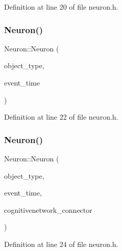 Definition at line 20 of file neuron.\+h.

\mbox{\label{class_neuron_a4611499895417d44250c452d0fc719a6}} 
\subsubsection{\texorpdfstring{Neuron()}{Neuron()}\hspace{0.1cm}{\footnotesize\ttfamily [3/4]}}
{\footnotesize\ttfamily Neuron\+::\+Neuron (\begin{DoxyParamCaption}\item[{unsigned int}]{object\+\_\+type,  }\item[{std\+::chrono\+::time\+\_\+point$<$ \hyperlink{universe_8h_a0ef8d951d1ca5ab3cfaf7ab4c7a6fd80}{Clock} $>$}]{event\+\_\+time }\end{DoxyParamCaption})\hspace{0.3cm}{\ttfamily [inline]}}



Definition at line 22 of file neuron.\+h.

\mbox{\label{class_neuron_a6839febd20fb8f776151e00142411a56}} 
\subsubsection{\texorpdfstring{Neuron()}{Neuron()}\hspace{0.1cm}{\footnotesize\ttfamily [4/4]}}
{\footnotesize\ttfamily Neuron\+::\+Neuron (\begin{DoxyParamCaption}\item[{unsigned int}]{object\+\_\+type,  }\item[{std\+::chrono\+::time\+\_\+point$<$ \hyperlink{universe_8h_a0ef8d951d1ca5ab3cfaf7ab4c7a6fd80}{Clock} $>$}]{event\+\_\+time,  }\item[{\hyperlink{class_cognitive_network}{Cognitive\+Network} \&}]{cognitivenetwork\+\_\+connector }\end{DoxyParamCaption})\hspace{0.3cm}{\ttfamily [inline]}}



Definition at line 24 of file neuron.\+h.

